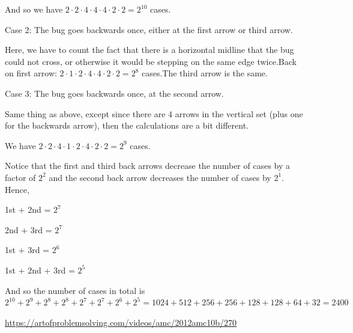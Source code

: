 \begin{enumerate}
 And so we have $2\cdot2\cdot4\cdot4\cdot4\cdot2\cdot2 = 2^{10}$ cases.

 Case 2: The bug goes backwards once, either at the first arrow or third arrow.

 Here, we have to count the fact that there is a horizontal midline that the bug could not cross, or otherwise it would be stepping on the same edge twice.Back on first arrow: $2\cdot1\cdot2\cdot4\cdot4\cdot2\cdot2 = 2^{8}$ cases.The third arrow is the same. 

 Case 3: The bug goes backwards once, at the second arrow.

 Same thing as above, except since there are 4 arrows in the vertical set (plus one for the backwards arrow), then the calculations are a bit different.

 We have $2\cdot2\cdot4\cdot1\cdot2\cdot4\cdot2\cdot2 = 2^{9}$ cases.

 Notice that the first and third back arrows decrease the number of cases by a factor of $2^2$ and the second back arrow decreases the number of cases by $2^1$. Hence,

 1st + 2nd = $2^7$

 2nd + 3rd = $2^7$

 1st + 3rd = $2^6$

 1st + 2nd + 3rd = $2^5$

 And so the number of cases in total is $2^{10} + 2^9 + 2^8 + 2^8 + 2^7 + 2^7 + 2^6 + 2^5 = 1024 + 512 + 256 + 256 + 128 + 128 + 64 + 32 = \boxed{2400}$

 


 \href{https://artofproblemsolving.com/videos/amc/2012amc10b/270}{https://artofproblemsolving.com/videos/amc/2012amc10b/270}

 


\end{enumerate}
